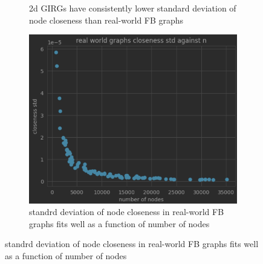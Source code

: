 \begin{figure}
\begin{subfigure}{0.49\textwidth}
    \caption{2d GIRGs have consistently lower standard deviation of node closeness than real-world FB graphs}
    \end{subfigure}
    \begin{subfigure}{0.49\textwidth}
    \includegraphics[width=\linewidth]{./figures/real_closeness_std_against_n.png}
    \caption{standrd deviation of node closeness in real-world FB graphs fits well as a function of number of nodes}
    \end{subfigure}
\end{figure}








